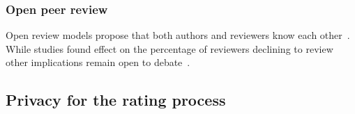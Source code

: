 \subsubsection*{Open peer review}

Open review models propose that both authors and reviewers know each
other~\cite{ford2013defining}. While studies found effect on the percentage of
reviewers declining to review~\cite{van1999effect} other implications remain
open to debate~\cite{groves2010open}.







\subsection{Privacy for the rating process}
\label{sec:privacyRating}



